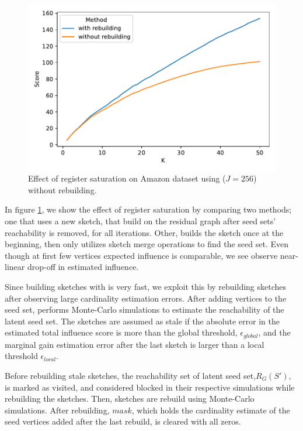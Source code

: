 \documentclass[10pt,journal,compsoc]{IEEEtran}
\newcommand\acro{{\sc{HyperFuseR\xspace}\xspace}\xspace}
\begin{document}
\begin{figure}[!ht]
    \begin{center}
    \includegraphics[width=\linewidth]{images/sketch-saturation.pdf}
    \caption{ Effect of register saturation on Amazon dataset using \acro($J=256$) without rebuilding.
     }\label{fig:sketch-saturation} 
    \end{center}
\end{figure}

In figure \ref{fig:sketch-saturation}, we show the effect of register saturation by comparing two methods; one that uses a new sketch, that build on the residual graph after seed sets' reachability is removed, for all iterations. Other, builds the sketch once at the beginning, then only utilizes sketch merge operations to find the seed set. 
Even though at first few vertices expected influence is comparable, we see observe near-linear drop-off in estimated influence.
    

Since building sketches with \acro is very fast, we exploit this by rebuilding sketches after observing large cardinality estimation errors.
After adding vertices to the seed set, \acro performs Monte-Carlo simulations to estimate the reachability of the latent seed set.
The sketches are assumed as stale if the absolute error in the estimated total influence score is more than the global threshold, $\epsilon_{global}$, 
and the marginal gain estimation error after the last sketch is larger than a local threshold $\epsilon_{local}$. 

Before rebuilding stale sketches, the reachability set of latent seed set,$R_G(S')$, is marked as visited, 
and considered blocked in their respective simulations while rebuilding the sketches. Then, sketches are rebuild using Monte-Carlo simulations. After rebuilding, $mask$, which holds the cardinality estimate of the seed vertices added after the last rebuild, is cleared with all zeros.
\end{document}
